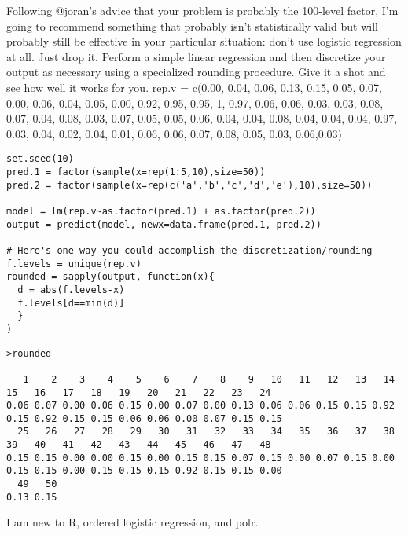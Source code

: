 \documentclass[a4paper,12pt]{article}
\begin{document}
Following @joran's advice that your problem is probably the 100-level factor, I'm going to recommend something that probably isn't statistically valid but will probably still be effective in your particular situation: don't use logistic regression at all. Just drop it. Perform a simple linear regression and then discretize your output as necessary using a specialized rounding procedure. Give it a shot and see how well it works for you.
rep.v = c(0.00, 0.04, 0.06, 0.13, 0.15, 0.05, 0.07, 0.00, 0.06, 0.04, 0.05, 0.00, 0.92, 0.95, 0.95, 1, 0.97, 0.06, 0.06, 0.03, 0.03, 0.08, 0.07, 0.04, 0.08, 0.03, 0.07, 0.05, 0.05, 0.06, 0.04, 0.04, 0.08, 0.04, 0.04, 0.04, 0.97, 0.03, 0.04, 0.02, 0.04, 0.01, 0.06, 0.06, 0.07, 0.08, 0.05, 0.03, 0.06,0.03)

\begin{framed}
\begin{verbatim}
set.seed(10)
pred.1 = factor(sample(x=rep(1:5,10),size=50))
pred.2 = factor(sample(x=rep(c('a','b','c','d','e'),10),size=50))

model = lm(rep.v~as.factor(pred.1) + as.factor(pred.2))
output = predict(model, newx=data.frame(pred.1, pred.2))

# Here's one way you could accomplish the discretization/rounding
f.levels = unique(rep.v)
rounded = sapply(output, function(x){ 
  d = abs(f.levels-x)
  f.levels[d==min(d)]
  }
)
\end{verbatim}
\end{framed}

\begin{verbatim}
>rounded

   1    2    3    4    5    6    7    8    9   10   11   12   13   14   15   16   17   18   19   20   21   22   23   24 
0.06 0.07 0.00 0.06 0.15 0.00 0.07 0.00 0.13 0.06 0.06 0.15 0.15 0.92 0.15 0.92 0.15 0.15 0.06 0.06 0.00 0.07 0.15 0.15 
  25   26   27   28   29   30   31   32   33   34   35   36   37   38   39   40   41   42   43   44   45   46   47   48 
0.15 0.15 0.00 0.00 0.15 0.00 0.15 0.15 0.07 0.15 0.00 0.07 0.15 0.00 0.15 0.15 0.00 0.15 0.15 0.15 0.92 0.15 0.15 0.00 
  49   50 
0.13 0.15 
\end{verbatim}
\newpage


I am new to R, ordered logistic regression, and polr.
\end{document}
